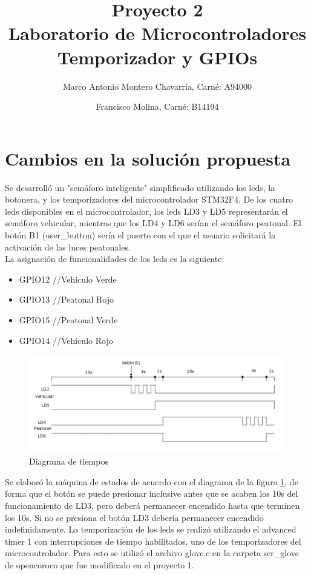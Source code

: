 \documentclass[letterpaper]{article}
\title{Proyecto 2\\ Laboratorio de Microcontroladores Temporizador y GPIOs }
\author{
Marco Antonio Montero Chavarría, Carné: A94000\\
 \and
Francisco Molina, Carné: B14194\\
}
\begin{document}
\maketitle
\section{Cambios en la solución propuesta}
Se desarrolló un "semáforo inteligente" simplificado utilizando los leds, la botonera, y los temporizadores del microcontrolador STM32F4. De los cuatro leds disponibles en el microcontrolador, los leds LD3 y LD5 representarán el semáforo vehicular, mientras que los LD4 y LD6 serían el semáforo peatonal. El botón B1 (user\_button) sería el puerto con el que el usuario solicitará la activación de las luces peatonales. \\[0.5cm]

La asignación de funcionalidades de los leds es la siguiente:

\begin{itemize}
\item GPIO12 //Vehiculo Verde
\item GPIO13 //Peatonal Rojo
\item GPIO15 //Peatonal Verde
\item GPIO14 //Vehiculo Rojo
\end{itemize}

\begin{figure}[hbtp]
\centering
\includegraphics[width=11 cm]{tiempo1.png}
\caption{Diagrama de tiempos}
\label{semaf}
\end{figure}

Se elaboró la máquina de estados de acuerdo con el diagrama de la figura \ref{semaf}, de forma que  el botón se puede presionar inclusive antes que se acaben los 10s  del funcionamiento de LD3, pero deberá permanecer encendido hasta que terminen los 10s. Si no se presiona el botón LD3 debería permanecer encendido indefinidamente. 
La temporización de los leds se realizó utilizando el advanced timer 1 con interrupciones de tiempo habilitados, uno de los temporizadores del microcontrolador. Para esto se utilizó el archivo glove.c en la carpeta scr\_glove de opencoroco que fue modificado en el proyecto 1.\cite{coroco}  \\[0.5cm]
\end{document}
